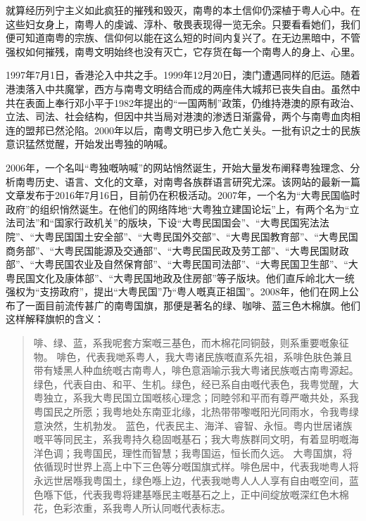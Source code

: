 就算经历列宁主义如此疯狂的摧残和毁灭，南粤的本土信仰仍深植于粤人心中。在这些妇女身上，南粤人的虔诚、淳朴、敬畏表现得一览无余。只要看看她们，我们便可知道南粤的宗族、信仰何以能在这么短的时间内复兴了。在无边黑暗中，不管强权如何摧残，南粤文明始终也没有灭亡，它存货在每一个南粤人的身上、心里。

1997年7月1日，香港沦入中共之手。1999年12月20日，澳门遭遇同样的厄运。随着港澳落入中共魔掌，西方与南粤文明结合而成的两座伟大城邦已丧失自由。虽然中共在表面上奉行邓小平于1982年提出的“一国两制”政策，仍维持港澳的原有政治、立法、司法、社会结构，但因中共当局对港澳的渗透日渐露骨，两个与南粤血肉相连的盟邦已然沦陷。2000年以后，南粤文明已步入危亡关头。一批有识之士的民族意识猛然觉醒，开始发出粤独的呐喊。

2006年，一个名叫“粤独嘅呐喊”的网站悄然诞生，开始大量发布阐释粤独理念、分析南粤历史、语言、文化的文章，对南粤各族群语言研究尤深。该网站的最新一篇文章发布于2016年7月16日，目前仍在积极活动。2007年，一个名为“大粤民国临时政府”的组织悄然诞生。在他们的网络阵地“大粤独立建国论坛”上，有两个名为“立法司法”和“国家行政机关”的版块，下设“大粤民国国会”、“大粤民国宪法法院”、“大粤民国国土安全部”、“大粤民国外交部”、“大粤民国教育部”、“大粤民国商务部”、“大粤民国能源及交通部”、“大粤民国民政及劳工部”、“大粤民国财政部”、“大粤民国农业及自然保育部”、“大粤民国司法部”、“大粤民国卫生部”、“大粤民国文化及康体部”、“大粤民国地政及住房部”等子版块。他们直斥岭北大一统强权为“支捞政府”，提出“大粤民国”乃“粤人嘅真正祖国”。2008年，他们在网上公布了一面目前流传甚广的南粤国旗，那便是著名的绿、咖啡、蓝三色木棉旗。他们这样解释旗帜的含义：

\begin{quote}
	
啡、绿、蓝，系我呢套方案嘅三基色，而木棉花同铜鼓，则系重要嘅象征物。
啡色，代表我哋系粤人，我大粤诸民族嘅直系先祖，系啡色肤色兼且带有矮黑人种血统嘅古南粤人，啡色意涵喻示我大粤诸民族嘅古南粤源起。
绿色，代表自由、和平、生机。绿色，经已系自由嘅代表色，我粤觉醒，大粤独立，系我大粤民国立国嘅核心理念；同睦邻和平而有尊严噉共处，系我粤国民之所愿；我粤地处东南亚北缘，北热带带嚟嘅阳光同雨水，令我粤绿意泱然，生机勃发。
蓝色，代表民主、海洋、睿智、永恒。粤内世居诸族嘅平等同民主，系我粤持久稳固嘅基石；我大粤族群同文明，有着显明嘅海洋色调；我粤国民，理性而智慧；我粤国运，恒长而久远。
大粤国旗，将依循现时世界上高上中下三色等分嘅国旗式样。啡色居中，代表我哋粤人将永远世居喺我粤国土，绿色喺上边，代表我哋粤人人人享有自由嘅空间，蓝色喺下低，代表我粤将建基喺民主嘅基石之上，正中间绽放嘅深红色木棉花，色彩浓重，系我粤人所认同嘅代表标志。

\end{quote}

